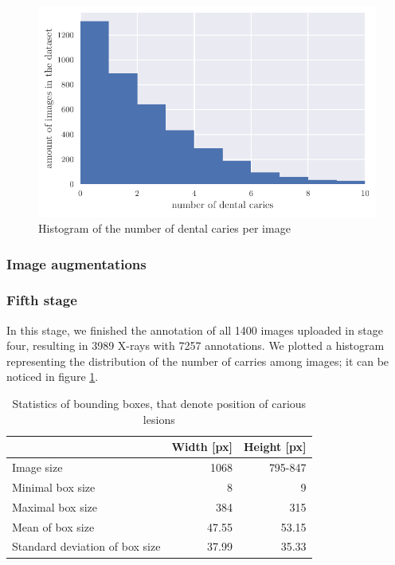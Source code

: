 \begin{figure}
    \includegraphics[width=0.9\linewidth]{images/caries_histogram.pdf}
    \caption{Histogram of the number of dental caries per image}
    \label{fig:hist_caries_per_img}
\end{figure}
\subsubsection{Image augmentations}

\subsubsection{Fifth stage}
In this stage, we finished the annotation of all 1400 images uploaded in stage four, resulting in 3989 X-rays with 7257 annotations. We plotted a histogram representing the distribution of the number of carries among images; it can be noticed in figure \ref{fig:hist_caries_per_img}.


\begin{table}
    \centering
    \begin{tabular}{|l|r|r|}
        \hline
                                       & Width [px] & Height [px] \\\hline
        Image size                     & 1068       & 795-847     \\ \hline
        Minimal box size               & 8          & 9           \\ \hline
        Maximal box size               & 384        & 315         \\ \hline
        Mean of box size               & 47.55      & 53.15       \\ \hline
        Standard deviation of box size & 37.99      & 35.33       \\ \hline
    \end{tabular}
    \caption{\label{tab:dataset_statistics}Statistics of bounding boxes, that denote position of carious lesions}
\end{table}

